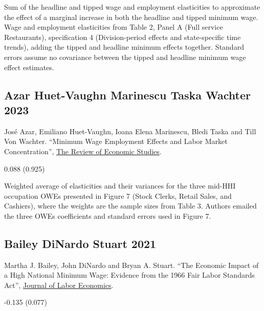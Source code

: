 \vspace{0.7em}

 Sum of the headline and tipped wage and employment elasticities to approximate the effect of a marginal increase in both the headline and tipped minimum wage. Wage and employment elasticities from Table 2, Panel A (Full service Restaurants), specification 4 (Division-period effects and state-specific time trends), adding the tipped and headline minimum effects together. Standard errors assume no covariance between the tipped and headline minimum wage effect estimates.

\subsection*{Azar Huet-Vaughn Marinescu Taska Wachter 2023}
\vspace{-0.7em}

\noindent José Azar, Emiliano Huet-Vaughn, Ioana Elena Marinescu, Bledi Taska and Till Von Wachter. ``Minimum Wage Employment Effects and Labor Market Concentration'', \href{https://doi.org/10.1093/restud/rdad091}{The Review of Economic Studies}.

\vspace{0.7em}

 0.088 (0.925)

\vspace{0.7em}

 Weighted average of elasticities and their variances for the three mid-HHI occupation OWEs presented in Figure 7 (Stock Clerks, Retail Sales, and Cashiers), where the weights are the sample sizes from Table 3. Authors emailed the three OWEs coefficients and standard errors used in Figure 7.

\subsection*{Bailey DiNardo Stuart 2021}
\vspace{-0.7em}

\noindent Martha J. Bailey, John DiNardo and Bryan A. Stuart. ``The Economic Impact of a High National Minimum Wage: Evidence from the 1966 Fair Labor Standards Act'', \href{https://doi.org/10.1086/712554}{Journal of Labor Economics}.

\vspace{0.7em}

 -0.135 (0.077)

